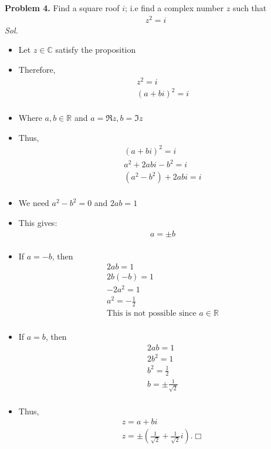 \documentclass[11pt]{article}
\begin{document}
  \clearpage
  {\bf Problem 4.} Find a square roof $i$; i.e find a complex number $z$ such that \begin{align*} & z^2 = i\end{align*}
  \textit{ Sol. }
	\begin{itemize}
    \item[] Let $z \in \mathbb{C}$ satisfy the proposition
    \item[] Therefore, \begin{align*}
      & z^2 = i \\
      & (a + bi)^2 = i\\
\end{align*}
\item[] Where $a, b \in \mathbb{R}$ and $a = \Re{z}, b = \Im{z}$
\item[] Thus, \begin{align*}
  & (a + bi)^2 = i \\
  & a^2 + 2abi - b^2 = i \\
  & (a^2 - b^2) + 2abi = i \\
\end{align*}
\item[] We need $a^2 - b^2 = 0$ and $2ab = 1$
\item[] This gives: 
\begin{align*}
    &  a = \pm b\\
  \end{align*}

    
        \item[] If $a = -b$, then \begin{align*}
      & 2ab = 1 \\
      & 2b(-b) = 1 \\
      & -2a^2 = 1 \\
      & a^2 = -\frac{1}{2} \\
      & \text{This is not possible since } a \in \mathbb{R} \\
      \end{align*}
    \item[] If $a = b$, then \begin{align*}
        & 2ab = 1\\
        & 2b^2 = 1\\
        & b^2 = \frac{1}{2}\\
        & b = \pm \frac{1}{\sqrt{2}}\\
      \end{align*}
\item[] Thus, \begin{align*}
     & z = a + bi \\
     & z = \pm (\frac{1}{\sqrt{2}} + \frac{1}{\sqrt{2}}i ).\Box \\
   \end{align*}
\end{itemize}
\end{document}
